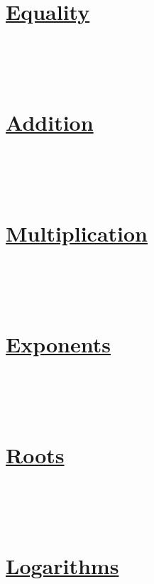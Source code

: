 \documentclass[12pt]{article}
\begin{document}
\twocolumn

\section*{\underline{Equality}}
\textbf{}
    \\
\\ \textbf{}
    \\



\section*{\underline{Addition}}
\textbf{}
    \\
\\ \textbf{}
    \\



\section*{\underline{Multiplication}}
\textbf{}
    \\
\\ \textbf{}
    \\



\section*{\underline{Exponents}}
\textbf{}
    \\
\\ \textbf{}
    \\



\section*{\underline{Roots}}
\textbf{}
    \\
\\ \textbf{}
    \\



\section*{\underline{Logarithms}}
\textbf{}
    \\
\\ \textbf{}
    \\
\end{document}

